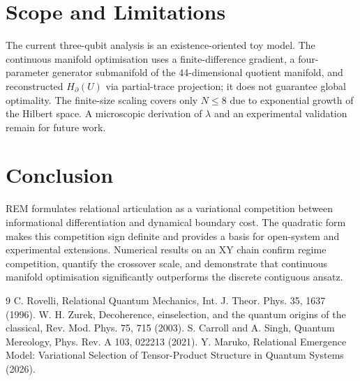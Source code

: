 \documentclass[11pt]{article}
\begin{document}
\section{Scope and Limitations}
The current three-qubit analysis is an existence-oriented toy model. The continuous manifold optimisation uses a finite-difference gradient, a four-parameter generator submanifold of the 44-dimensional quotient manifold, and reconstructed $H_{\partial}(U)$ via partial-trace projection; it does not guarantee global optimality. The finite-size scaling covers only $N\leq8$ due to exponential growth of the Hilbert space. A microscopic derivation of $\lambda$ and an experimental validation remain for future work.

\section{Conclusion}
REM formulates relational articulation as a variational competition between informational differentiation and dynamical boundary cost. The quadratic form makes this competition sign definite and provides a basis for open-system and experimental extensions. Numerical results on an XY chain confirm regime competition, quantify the crossover scale, and demonstrate that continuous manifold optimisation significantly outperforms the discrete contiguous ansatz.

\begin{thebibliography}{9}
 C. Rovelli, Relational Quantum Mechanics, Int. J. Theor. Phys. 35, 1637 (1996).
 W. H. Zurek, Decoherence, einselection, and the quantum origins of the classical, Rev. Mod. Phys. 75, 715 (2003).
 S. Carroll and A. Singh, Quantum Mereology, Phys. Rev. A 103, 022213 (2021).
 Y. Maruko, Relational Emergence Model: Variational Selection of Tensor-Product Structure in Quantum Systems (2026).
\end{thebibliography}
\end{document}
